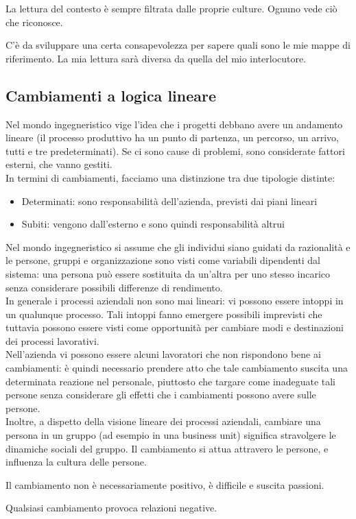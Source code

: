 La lettura del contesto \`e sempre filtrata dalle proprie culture. Ognuno vede ci\`o
che riconosce.

C'\`e da sviluppare una certa consapevolezza per sapere quali sono le mie mappe
di riferimento. La mia lettura sar\`a diversa da quella del mio interlocutore.

\subsection{Cambiamenti a logica lineare}

Nel mondo ingegneristico vige l'idea che i progetti debbano avere un andamento
lineare (il processo produttivo ha un punto di partenza, un percorso, un arrivo,
tutti e tre predeterminati). Se ci sono cause di problemi, sono considerate
fattori esterni, che vanno gestiti. \\
In termini di cambiamenti, facciamo una distinzione tra due tipologie distinte:
\begin{itemize}
  \item Determinati: sono responsabilit\`a dell'azienda, previsti dai piani lineari
  \item Subiti: vengono dall'esterno e sono quindi responsabilit\`a altrui
\end{itemize}
Nel mondo ingegneristico si assume che gli individui siano guidati da
razionalit\`a e le persone, gruppi e organizzazione sono visti come variabili
dipendenti dal sistema: una persona pu\`o essere sostituita da un'altra per uno
stesso incarico senza considerare possibili differenze di rendimento. \\
In generale i processi aziendali non sono mai lineari: vi possono essere intoppi
in un qualunque processo. Tali intoppi fanno emergere possibili imprevisti che
tuttavia possono essere visti come opportunit\`a per cambiare modi e
destinazioni dei processi lavorativi. \\
Nell'azienda vi possono essere alcuni lavoratori che non rispondono bene ai
cambiamenti: \`e quindi necessario prendere atto che tale cambiamento suscita
una determinata reazione nel personale, piuttosto che targare come inadeguate
tali persone senza considerare gli effetti che i cambiamenti possono avere sulle
persone. \\
Inoltre, a dispetto della visione lineare dei processi aziendali, cambiare una
persona in un gruppo (ad esempio in una business unit) significa stravolgere le
dinamiche sociali del gruppo. Il cambiamento si attua attravero le persone, e 
influenza la cultura delle persone.

Il cambiamento non \`e necessariamente positivo, \`e difficile e suscita
passioni.

Qualsiasi cambiamento provoca relazioni negative.
